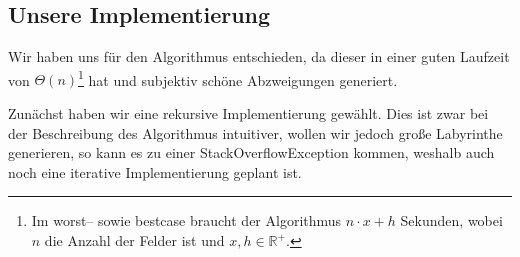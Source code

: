 \subsection{Unsere Implementierung}\label{subsec:unsere-implementierung}
    \begin{figure}[ht!]
        
    \end{figure}
    Wir haben uns für den  Algorithmus entschieden, da dieser in einer guten Laufzeit von $\Theta(n)$\footnote{Im worst-- sowie bestcase braucht der Algorithmus $n\cdot x+h$ Sekunden, wobei $n$ die Anzahl der Felder ist und $x,h\in\mathbb{R}^+$.} hat und subjektiv schöne Abzweigungen generiert.


    Zunächst haben wir eine rekursive Implementierung gewählt.
    Dies ist zwar bei der Beschreibung des Algorithmus intuitiver, wollen wir jedoch große Labyrinthe generieren, so kann es zu einer StackOverflowException kommen, weshalb auch noch eine iterative Implementierung geplant ist.


